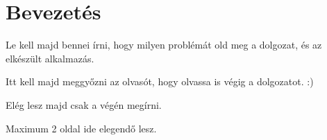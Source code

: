\chapter{Bevezetés}

Le kell majd bennei írni, hogy milyen problémát old meg a dolgozat, és az elkészült alkalmazás.

Itt kell majd meggyőzni az olvasót, hogy olvassa is végig a dolgozatot. :)

Elég lesz majd csak a végén megírni.

Maximum 2 oldal ide elegendő lesz.

